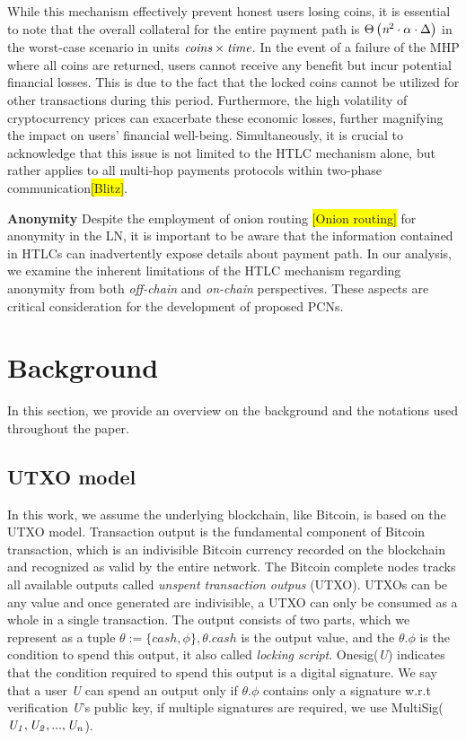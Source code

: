 \documentclass[conference]{IEEEtran}
\begin{document}
While this mechanism effectively prevent honest users losing coins, it is essential to note that the overall collateral for the entire payment path 
is $\Theta \left ( \emph{n}^{2}\cdot \alpha\cdot  \Delta  \right )$ in the worst-case scenario in units $ \emph{coins}\times \emph{time}$. 
In the event of a failure of the MHP where all coins are returned, users cannot receive any benefit but incur potential financial
losses. This is due to the fact that the locked coins cannot be utilized for other transactions during this period. Furthermore, the high 
volatility of cryptocurrency prices can exacerbate these economic losses, further magnifying the impact on users' financial well-being. 
Simultaneously, it is crucial to acknowledge that this issue is not limited to the HTLC mechanism alone, but rather
applies to all multi-hop payments protocols within two-phase communication\colorbox{yellow}{[Blitz]}. 

\textbf{Anonymity} Despite the employment of onion routing \colorbox{yellow}{[Onion routing]} for anonymity in the LN, it is important
to be aware that the information contained in HTLCs can inadvertently expose details about payment path. In our analysis,
we examine the inherent limitations of the HTLC mechanism regarding anonymity from both \textit{off-chain} and \textit{on-chain}
perspectives. These aspects are critical consideration for the development of proposed PCNs.



\section{Background}
In this section, we provide an overview on the background and the
notations used throughout the paper.
\subsection{UTXO model}

In this work, we assume the underlying blockchain, like Bitcoin, is based on the UTXO model. Transaction output is the fundamental 
component of Bitcoin transaction, which is an indivisible Bitcoin currency recorded on the blockchain and recognized as valid by 
the entire network. The Bitcoin complete nodes tracks all available outputs called \emph{unspent transaction outpus} (UTXO). 
UTXOs can be any value and once generated are indivisible, a UTXO can only be consumed as a whole in a single transaction. 
The output consists of two parts, which we represent as a tuple $\theta :=\{cash,\phi\}, \theta.cash$ is the output value,
 and the $\theta.\phi$ is the condition to spend this output, it also called \emph{locking script}. Onesig(\emph{U}) indicates 
 that the condition required to spend this output is a digital signature. We say that a user \emph{U} can spend an output only if
 $\theta.\phi$ contains only a signature w.r.t verification  \emph{U}'s public key, if multiple signatures are required, we use 
 MultiSig($\it U_1,U_2,...,U_n$).
\end{document}
